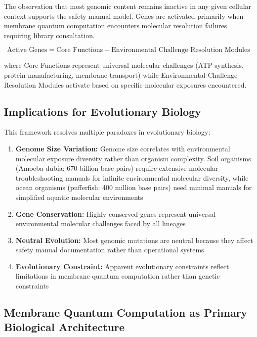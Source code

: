 \documentclass[12pt,a4paper]{article}
\begin{document}
The observation that most genomic content remains inactive in any given cellular context supports the safety manual model. Genes are activated primarily when membrane quantum computation encounters molecular resolution failures requiring library consultation.

\begin{equation}
\text{Active Genes} = \text{Core Functions} + \text{Environmental Challenge Resolution Modules}
\end{equation}

where Core Functions represent universal molecular challenges (ATP synthesis, protein manufacturing, membrane transport) while Environmental Challenge Resolution Modules activate based on specific molecular exposures encountered.

\subsection{Implications for Evolutionary Biology}

This framework resolves multiple paradoxes in evolutionary biology:

\begin{enumerate}
\item \textbf{Genome Size Variation:} Genome size correlates with environmental molecular exposure diversity rather than organism complexity. Soil organisms (Amoeba dubia: 670 billion base pairs) require extensive molecular troubleshooting manuals for infinite environmental molecular diversity, while ocean organisms (pufferfish: 400 million base pairs) need minimal manuals for simplified aquatic molecular environments
\item \textbf{Gene Conservation:} Highly conserved genes represent universal environmental molecular challenges faced by all lineages
\item \textbf{Neutral Evolution:} Most genomic mutations are neutral because they affect safety manual documentation rather than operational systems
\item \textbf{Evolutionary Constraint:} Apparent evolutionary constraints reflect limitations in membrane quantum computation rather than genetic constraints
\end{enumerate}

\subsection{Membrane Quantum Computation as Primary Biological Architecture}
\end{document}
